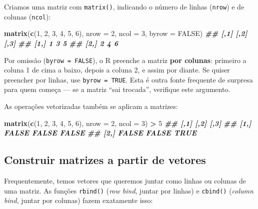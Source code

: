 \documentclass[
  portuguese,
  11pt,
  openany]{book}
\newenvironment{Shaded}{\begin{snugshade}}{\end{snugshade}}
\newcommand{\AttributeTok}[1]{\textcolor[rgb]{0.13,0.29,0.53}{#1}}
\newcommand{\ConstantTok}[1]{\textcolor[rgb]{0.56,0.35,0.01}{#1}}
\newcommand{\DecValTok}[1]{\textcolor[rgb]{0.00,0.00,0.81}{#1}}
\newcommand{\DocumentationTok}[1]{\textcolor[rgb]{0.56,0.35,0.01}{\textbf{\textit{#1}}}}
\newcommand{\FunctionTok}[1]{\textcolor[rgb]{0.13,0.29,0.53}{\textbf{#1}}}
\newcommand{\NormalTok}[1]{#1}
\newcommand{\SpecialCharTok}[1]{\textcolor[rgb]{0.81,0.36,0.00}{\textbf{#1}}}
\begin{document}
Criamos uma matriz com \texttt{matrix()}, indicando o número de linhas (\texttt{nrow}) e de
colunas (\texttt{ncol}):

\begin{Shaded}
\begin{Highlighting}[]
\FunctionTok{matrix}\NormalTok{(}\FunctionTok{c}\NormalTok{(}\DecValTok{1}\NormalTok{, }\DecValTok{2}\NormalTok{, }\DecValTok{3}\NormalTok{, }\DecValTok{4}\NormalTok{, }\DecValTok{5}\NormalTok{, }\DecValTok{6}\NormalTok{), }\AttributeTok{nrow =} \DecValTok{2}\NormalTok{, }\AttributeTok{ncol =} \DecValTok{3}\NormalTok{, }\AttributeTok{byrow =} \ConstantTok{FALSE}\NormalTok{)}
\DocumentationTok{\#\#      [,1] [,2] [,3]}
\DocumentationTok{\#\# [1,]    1    3    5}
\DocumentationTok{\#\# [2,]    2    4    6}
\end{Highlighting}
\end{Shaded}

Por omissão (\texttt{byrow\ =\ FALSE}), o R preenche a matriz \textbf{por colunas}: primeiro a
coluna 1 de cima a baixo, depois a coluna 2, e assim por diante. Se quiser
preencher por linhas, use \texttt{byrow\ =\ TRUE}. Esta é outra fonte frequente de
surpresa para quem começa --- se a matriz ``sai trocada'', verifique este argumento.

As operações vetorizadas também se aplicam a matrizes:

\begin{Shaded}
\begin{Highlighting}[]
\FunctionTok{matrix}\NormalTok{(}\FunctionTok{c}\NormalTok{(}\DecValTok{1}\NormalTok{, }\DecValTok{2}\NormalTok{, }\DecValTok{3}\NormalTok{, }\DecValTok{4}\NormalTok{, }\DecValTok{5}\NormalTok{, }\DecValTok{6}\NormalTok{), }\AttributeTok{nrow =} \DecValTok{2}\NormalTok{, }\AttributeTok{ncol =} \DecValTok{3}\NormalTok{) }\SpecialCharTok{\textgreater{}} \DecValTok{5}
\DocumentationTok{\#\#       [,1]  [,2]  [,3]}
\DocumentationTok{\#\# [1,] FALSE FALSE FALSE}
\DocumentationTok{\#\# [2,] FALSE FALSE  TRUE}
\end{Highlighting}
\end{Shaded}

\subsection{Construir matrizes a partir de vetores}\label{construir-matrizes-a-partir-de-vetores}

Frequentemente, temos vetores que queremos juntar como linhas ou colunas de uma
matriz. As funções \texttt{rbind()} (\emph{row bind}, juntar por linhas) e \texttt{cbind()} (\emph{column
bind}, juntar por colunas) fazem exatamente isso:
\end{document}
